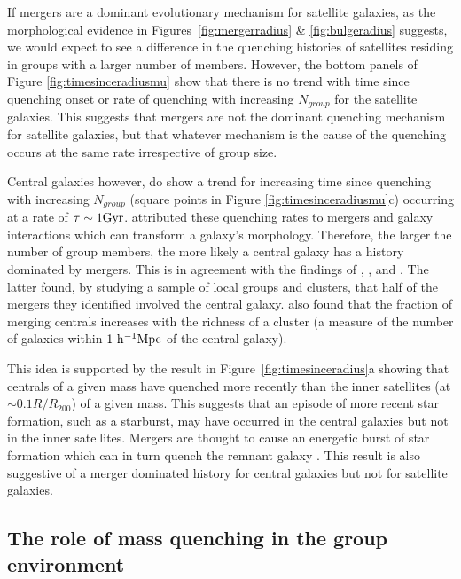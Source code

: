\documentclass[useAMS,usenatbib]{mn2e}
\begin{document}
If mergers are a dominant evolutionary mechanism for satellite galaxies, as the morphological evidence in Figures~\ref{fig:mergerradius} \& \ref{fig:bulgeradius} suggests, we would expect to see a difference in the quenching histories of satellites residing in groups with a larger number of members. However, the bottom panels of Figure \ref{fig:timesinceradiusmu} show that there is no trend with time since quenching onset or rate of quenching with increasing $N_{group}$ for the satellite galaxies. This suggests that mergers are not the dominant quenching mechanism for satellite galaxies, but that whatever mechanism is the cause of the quenching occurs at the same rate irrespective of group size. 

Central galaxies however, do show a trend for increasing time since quenching with increasing $N_{group}$ (square points in Figure \ref{fig:timesinceradiusmu}c) occurring at a rate of $\tau \sim 1 \rm{Gyr}$. \cite{smethurst15} attributed these quenching rates to mergers and galaxy interactions which can transform a galaxy's morphology. Therefore, the larger the number of group members, the more likely a central galaxy has a history dominated by mergers. This is in agreement with the findings of \citet{lin10}, \citet{ellison10}, \citet{lidman13} and \citet{mcintosh08}. The latter found, by studying a sample of local groups and clusters, that half of the mergers they identified involved the central galaxy. \cite{liu09} also found that the fraction of merging centrals increases with the richness of a cluster (a measure of the number of galaxies within $1~\rm{h}^{-1}\rm{Mpc}$ of the central galaxy).

This idea is supported by the result in Figure~\ref{fig:timesinceradius}a showing that centrals of a given mass have quenched more recently than the inner satellites (at $\sim0.1R/R_{200}$) of a given mass. This suggests that an episode of more recent star formation, such as a starburst, may have occurred in the central galaxies but not in the inner satellites. Mergers are thought to cause an energetic burst of star formation which can in turn quench the remnant galaxy \citep{hopkins05, treister12, pontzen16}. This result is also suggestive of a merger dominated history for central galaxies but not for satellite galaxies.

\subsection{The role of mass quenching in the group environment}\label{sec:rolemassenv}
\end{document}
